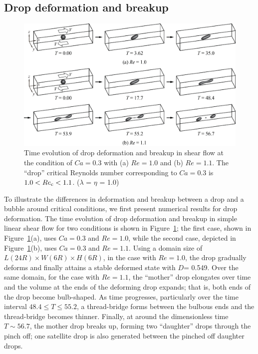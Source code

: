 \documentclass[review]{elsarticle}
\newcommand{\lwh}[3]{L(#1R)\times W(#2R) \times H(#3R)}
\begin{document}
\subsection{Drop deformation and breakup}\label{sec:DropBreak}
% 
\begin{figure}%
  \centering
  \includegraphics[width=\textwidth]{4-DropBreakEvol}
  \caption{Time evolution of drop deformation and breakup in shear flow at the
           condition of $Ca=0.3$ with (a) $Re=1.0$ and (b) $Re=1.1$.  The
	   ``drop'' critical Reynolds number corresponding to $Ca=0.3$ is
	   $1.0<Re_{\rm c}<1.1$.
	   ($\lambda$ = $\eta$ = 1.0)}
  \label{fig:DropBreak}
\end{figure}
%
To illustrate the differences in deformation and breakup between a drop and a
bubble around critical conditions, we first present numerical results for drop
deformation.  The time evolution of drop deformation and breakup in simple
linear shear flow for two conditions is shown in Figure~\ref{fig:DropBreak};
the first case, shown in Figure~\ref{fig:DropBreak}(a), uses $Ca=0.3$ and
$Re=1.0$, while the second case, depicted in Figure~\ref{fig:DropBreak}(b),
uses $Ca=0.3$ and $Re=1.1$.  Using a domain size of $\lwh{24}{6}{6}$, in the
case with $Re=1.0$, the drop gradually deforms and finally attains a stable
deformed state with $D$= 0.549.  Over the same domain, for the case with
$Re=1.1$, the ``mother'' drop elongates over time and the volume at the ends of
the deforming drop expands; that is, both ends of the drop become bulb-shaped.
As time progresses, particularly over the time interval $48.4 \leq T \leq
55.2$, a thread-bridge forms between the bulbous ends and the thread-bridge
becomes thinner.  Finally, at around the dimensionless time $T\sim 56.7$, the
mother drop breaks up, forming two ``daughter'' drops through the pinch off;
one satellite drop is also generated between the pinched off daughter drops.
\end{document}
